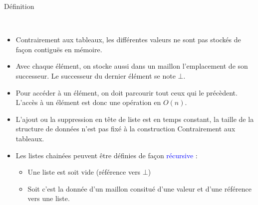 \documentclass[10pt]{beamer}
\begin{document}
\begin{frame}{\Ctitle}{\stitle}
	\begin{alertblock}{Définition}
		\begin{center}
			  \quad {} \          \  
		\end{center}
		\begin{itemize}
			\item<2-> Contrairement aux tableaux, les différentes valeurs ne sont pas stockés de façon contiguës en mémoire.
			\item<3-> Avec chaque élément, on stocke aussi dans un \og{} maillon \fg{} l'emplacement de son successeur. Le successeur du dernier élément se note $\bot$.
			\item<4-> Pour accéder à un élément, on doit parcourir tout ceux qui le précèdent. L'accès à un élément est donc une opération en $O(n)$.
			\item<5-> L'ajout  ou la suppression en tête de liste est en temps constant, la taille de la structure de données n'est pas fixé à la construction Contrairement aux tableaux.
			\item<6-> Les listes chainées peuvent être définies de façon \textcolor{blue}{récursive} :
				\begin{itemize}
					\item<7-> Une liste est soit vide (référence vers $\bot$)
					\item<8-> Soit c'est la donnée d'un maillon consitué d'une valeur et d'une référence vers une liste.
				\end{itemize}
		\end{itemize}
	\end{alertblock}
\end{frame}

\end{document}
